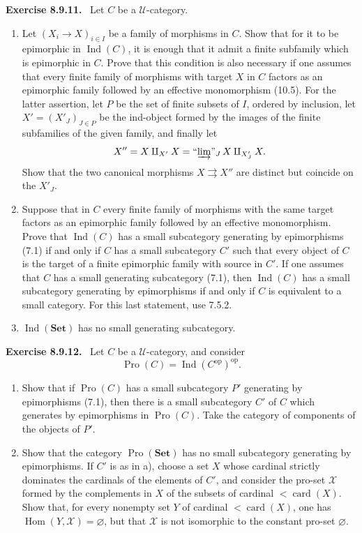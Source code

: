 \documentclass[11pt]{article}
\newcommand{\U}{\mathcal{U}}
\newcommand{\Set}{\mathbf{Set}}
\newcommand{\Hom}{\operatorname{Hom}}
\newcommand{\Ind}{\operatorname{Ind}}
\newcommand{\Pro}{\operatorname{Pro}}
\newcommand{\card}{\operatorname{card}}
\newcommand{\op}{\mathrm{op}}
\newcommand{\indlim}{\textrm{``}\!\varinjlim\!\textrm{''}}
\newenvironment{statement}[1]{\par\medskip\noindent\textbf{#1.}\ }{\par\medskip}
\begin{document}
\begin{statement}{Exercise 8.9.11}
Let $C$ be a $\U$-category.
\begin{enumerate}[label=\alph*)]
\item Let $(X_i\to X)_{i\in I}$ be a family of morphisms in $C$. Show that for it to be epimorphic in $\Ind(C)$, it is enough that it admit a finite subfamily which is epimorphic in $C$. Prove that this condition is also necessary if one assumes that every finite family of morphisms with target $X$ in $C$ factors as an epimorphic family followed by an effective monomorphism (10.5). For the latter assertion, let $P$ be the set of finite subsets of $I$, ordered by inclusion, let $X'=(X'_J)_{J\in P}$ be the ind-object formed by the images of the finite subfamilies of the given family, and finally let
\[
 X''=X\amalg_{X'}X=\indlim_J\,X\amalg_{X'_J}X.
\]
Show that the two canonical morphisms $X\rightrightarrows X''$ are distinct but coincide on the $X'_J$.

\item Suppose that in $C$ every finite family of morphisms with the same target factors as an epimorphic family followed by an effective monomorphism. Prove that $\Ind(C)$ has a small subcategory generating by epimorphisms (7.1) if and only if $C$ has a small subcategory $C'$ such that every object of $C$ is the target of a finite epimorphic family with source in $C'$. If one assumes that $C$ has a small generating subcategory (7.1), then $\Ind(C)$ has a small subcategory generating by epimorphisms if and only if $C$ is equivalent to a small category. For this last statement, use 7.5.2.

\item $\Ind(\Set)$ has no small generating subcategory.
\end{enumerate}
\end{statement}

\begin{statement}{Exercise 8.9.12}
Let $C$ be a $\U$-category, and consider
\[
 \Pro(C)=\Ind(C^\op)^\op.
\]
\begin{enumerate}[label=\alph*)]
\item Show that if $\Pro(C)$ has a small subcategory $P'$ generating by epimorphisms (7.1), then there is a small subcategory $C'$ of $C$ which generates by epimorphisms in $\Pro(C)$. Take the category of components of the objects of $P'$.

\item Show that the category $\Pro(\Set)$ has no small subcategory generating by epimorphisms. If $C'$ is as in a), choose a set $X$ whose cardinal strictly dominates the cardinals of the elements of $C'$, and consider the pro-set $\mathcal X$ formed by the complements in $X$ of the subsets of cardinal $<\card(X)$. Show that, for every nonempty set $Y$ of cardinal $<\card(X)$, one has $\Hom(Y,\mathcal X)=\varnothing$, but that $\mathcal X$ is not isomorphic to the constant pro-set $\varnothing$.
\end{enumerate}
\end{statement}
\end{document}
